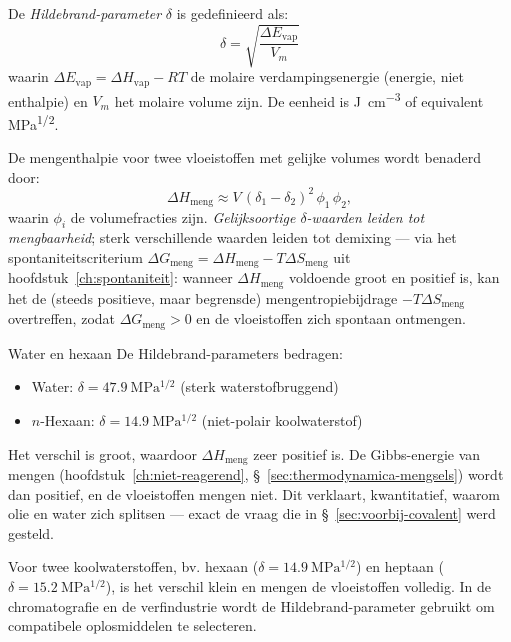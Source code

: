 De \emph{Hildebrand-parameter} $\delta$ is gedefinieerd als:
\begin{equation}
\boxed{\;\delta = \sqrt{\frac{\Delta E_{\text{vap}}}{V_m}}\;}
\end{equation}
waarin $\Delta E_{\text{vap}} = \Delta H_{\text{vap}} - RT$ de molaire verdampingsenergie (energie, niet enthalpie) en $V_m$ het molaire volume zijn. De eenheid is \si{\joule\per\centi\metre\cubed} of equivalent \si{\mega\pascal^{1/2}}.

De mengenthalpie voor twee vloeistoffen met gelijke volumes wordt benaderd door:
\begin{equation}
\Delta H_{\text{meng}} \approx V\,(\delta_1 - \delta_2)^2\,\phi_1\,\phi_2,
\end{equation}
waarin $\phi_i$ de volumefracties zijn. \emph{Gelijksoortige $\delta$-waarden leiden tot mengbaarheid}; sterk verschillende waarden leiden tot demixing --- via het spontaniteitscriterium $\Delta G_{\text{meng}}=\Delta H_{\text{meng}}-T\Delta S_{\text{meng}}$ uit hoofdstuk~\ref{ch:spontaniteit}: wanneer $\Delta H_{\text{meng}}$ voldoende groot en positief is, kan het de (steeds positieve, maar begrensde) mengentropiebijdrage $-T\Delta S_{\text{meng}}$ overtreffen, zodat $\Delta G_{\text{meng}}>0$ en de vloeistoffen zich spontaan ontmengen.

\begin{voorbeeld}{Water en hexaan}
De Hildebrand-parameters bedragen:
\begin{itemize}
\item Water: $\delta = \SI{47.9}{\mega\pascal^{1/2}}$ (sterk waterstofbruggend)
\item $n$-Hexaan: $\delta = \SI{14.9}{\mega\pascal^{1/2}}$ (niet-polair koolwaterstof)
\end{itemize}
Het verschil is groot, waardoor $\Delta H_{\text{meng}}$ zeer positief is. De Gibbs-energie van mengen (hoofdstuk~\ref{ch:niet-reagerend}, \S~\ref{sec:thermodynamica-mengsels}) wordt dan positief, en de vloeistoffen mengen niet. Dit verklaart, kwantitatief, waarom olie en water zich splitsen --- exact de vraag die in \S~\ref{sec:voorbij-covalent} werd gesteld.

Voor twee koolwaterstoffen, bv. hexaan ($\delta = \SI{14.9}{\mega\pascal^{1/2}}$) en heptaan ($\delta = \SI{15.2}{\mega\pascal^{1/2}}$), is het verschil klein en mengen de vloeistoffen volledig. In de chromatografie en de verfindustrie wordt de Hildebrand-parameter gebruikt om compatibele oplosmiddelen te selecteren.
\end{voorbeeld}


